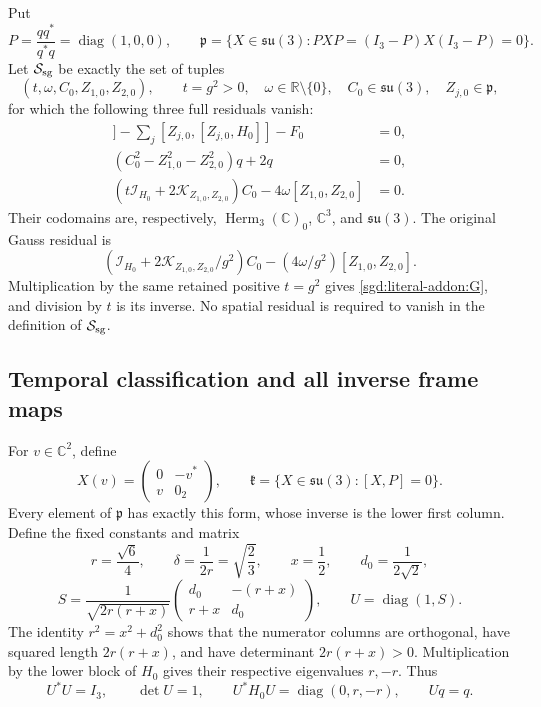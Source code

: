 Put
\[
 P=\frac{qq^*}{q^*q}=\operatorname{diag}(1,0,0),\qquad
 \mathfrak p=\{X\in\mathfrak{su}(3):
 PXP=(I_3-P)X(I_3-P)=0\}.
\]
Let $\mathcal S_{\rm sg}$ be exactly the set of tuples
\[
 (t,\omega,C_0,Z_{1,0},Z_{2,0}),\qquad
 t=g^2>0,\quad \omega\in\mathbb R\setminus\{0\},\quad
 C_0\in\mathfrak{su}(3),\quad Z_{j,0}\in\mathfrak p,
\]
for which the following three full residuals vanish:
\begin{align}
 [C_0,[C_0,H_0]]
 -\sum_j[Z_{j,0},[Z_{j,0},H_0]]-F_0&=0,
 \label{sgd:literal-addon:H}\\
 (C_0^2-Z_{1,0}^2-Z_{2,0}^2)q+2q&=0,
 \label{sgd:literal-addon:q}\\
 (t\mathcal I_{H_0}+2\mathcal K_{Z_{1,0},Z_{2,0}})C_0
 -4\omega[Z_{1,0},Z_{2,0}]&=0.
 \label{sgd:literal-addon:G}
\end{align}
Their codomains are, respectively,
$\operatorname{Herm}_3(\mathbb C)_0$, $\mathbb C^3$, and
$\mathfrak{su}(3)$. The original Gauss residual is
\[
 (\mathcal I_{H_0}+2\mathcal K_{Z_{1,0},Z_{2,0}}/g^2)C_0
 -(4\omega/g^2)[Z_{1,0},Z_{2,0}].
\]
Multiplication by the same retained positive $t=g^2$ gives
\eqref{sgd:literal-addon:G}, and division by $t$ is its inverse.
No spatial residual is required to vanish in the definition of
$\mathcal S_{\rm sg}$.

\subsection{Temporal classification and all inverse frame maps}

For $v\in\mathbb C^2$, define
\[
 X(v)=\begin{pmatrix}0&-v^*\\v&0_2\end{pmatrix},\qquad
 \mathfrak k=\{X\in\mathfrak{su}(3):[X,P]=0\}.
\]
Every element of $\mathfrak p$ has exactly this form, whose inverse
is the lower first column. Define the fixed constants and matrix
\[
 r=\frac{\sqrt6}{4},\qquad \delta=\frac1{2r}=\sqrt{\frac23},
 \qquad x=\frac12,\qquad d_0=\frac1{2\sqrt2},
\]
\[
 S=\frac1{\sqrt{2r(r+x)}}
 \begin{pmatrix}d_0&-(r+x)\\r+x&d_0\end{pmatrix},
 \qquad U=\operatorname{diag}(1,S).
\]
The identity $r^2=x^2+d_0^2$ shows that the numerator columns
are orthogonal, have squared length $2r(r+x)$, and have determinant
$2r(r+x)>0$. Multiplication by the lower block of $H_0$ gives
their respective eigenvalues $r,-r$. Thus
\[
 U^*U=I_3,\qquad \det U=1,\qquad
 U^*H_0U=\operatorname{diag}(0,r,-r),\qquad Uq=q.
\]

